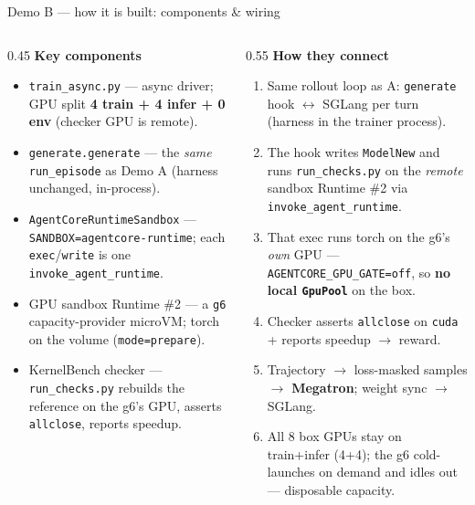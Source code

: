 \documentclass[aspectratio=169]{beamer}
\begin{document}
\begin{frame}{Demo B --- how it is built: components \& wiring}
  \begin{columns}[T]
    \begin{column}{0.45\textwidth}
      \scriptsize\textbf{Key components}
      \begin{itemize}\setlength\itemsep{0.15em}
        \item \texttt{train\_async.py} --- async driver; GPU split \textbf{4 train + 4 infer + 0 env} (checker GPU is remote).
        \item \texttt{generate.generate} --- the \emph{same} \texttt{run\_episode} as Demo A (harness unchanged, in-process).
        \item \texttt{AgentCoreRuntimeSandbox} --- \texttt{SANDBOX=agentcore-runtime}; each \texttt{exec}/\texttt{write} is one \texttt{invoke\_agent\_runtime}.
        \item GPU sandbox Runtime \#2 --- a \texttt{g6} capacity-provider microVM; torch on the volume (\texttt{mode=prepare}).
        \item KernelBench checker --- \texttt{run\_checks.py} rebuilds the reference on the g6's GPU, asserts \texttt{allclose}, reports speedup.
      \end{itemize}
    \end{column}
    \begin{column}{0.55\textwidth}
      \scriptsize\textbf{How they connect}
      \begin{enumerate}\setlength\itemsep{0.15em}
        \item Same rollout loop as A: \texttt{generate} hook $\leftrightarrow$ SGLang per turn (harness in the trainer process).
        \item The hook writes \texttt{ModelNew} and runs \texttt{run\_checks.py} on the \emph{remote} sandbox Runtime \#2 via \texttt{invoke\_agent\_runtime}.
        \item That exec runs torch on the g6's \emph{own} GPU --- \texttt{AGENTCORE\_GPU\_GATE=off}, so \textbf{no local \texttt{GpuPool}} on the box.
        \item Checker asserts \texttt{allclose} on \texttt{cuda} + reports speedup $\to$ reward.
        \item Trajectory $\to$ loss-masked samples $\to$ \textbf{Megatron}; weight sync $\to$ SGLang.
        \item All 8 box GPUs stay on train+infer (4+4); the g6 cold-launches on demand and idles out --- disposable capacity.
      \end{enumerate}
    \end{column}
  \end{columns}
\end{frame}
\end{document}
